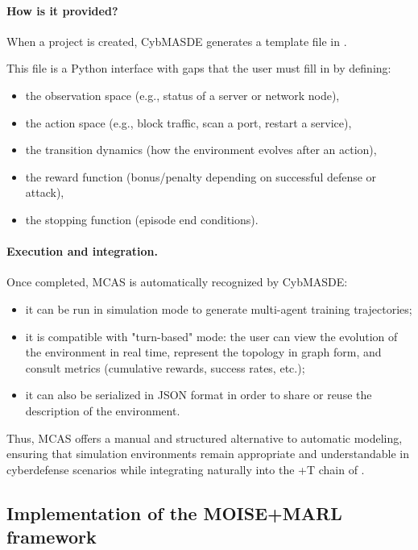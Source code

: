 \paragraph{How is it provided?}
When a project is created, CybMASDE generates a template file in .

This file is a Python interface with gaps that the user must fill in by defining:
\begin{itemize}
  \item the observation space (e.g., status of a server or network node),
  \item the action space (e.g., block traffic, scan a port, restart a service),
  \item the transition dynamics (how the environment evolves after an action),
  \item the reward function (bonus/penalty depending on successful defense or attack),
  \item the stopping function (episode end conditions).
\end{itemize}

\paragraph{Execution and integration.}
Once completed, MCAS is automatically recognized by CybMASDE:
\begin{itemize}
  \item it can be run in simulation mode to generate multi-agent training trajectories;
  \item it is compatible with "turn-based" mode: the user can view the evolution of the environment in real time, represent the topology in graph form, and consult metrics (cumulative rewards, success rates, etc.);
  \item it can also be serialized in JSON format in order to share or reuse the description of the environment.
\end{itemize}

Thus, MCAS offers a manual and structured alternative to automatic modeling, ensuring that simulation environments remain appropriate and understandable in cyberdefense scenarios while integrating naturally into the +T chain of .


\subsection{Implementation of the MOISE+MARL framework}

